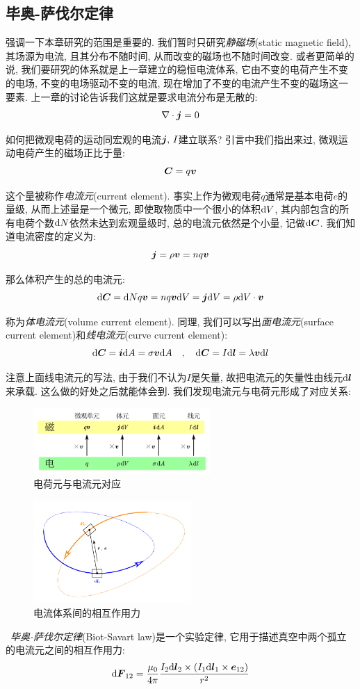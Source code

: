 \subsection{毕奥-萨伐尔定律}

强调一下本章研究的范围是重要的. 我们暂时只研究\emph{静磁场}(static magnetic field), 其场源为电流, 且其分布不随时间, 从而改变的磁场也不随时间改变. 或者更简单的说, 我们要研究的体系就是上一章建立的稳恒电流体系, 它由不变的电荷产生不变的电场, 不变的电场驱动不变的电流, 现在增加了不变的电流产生不变的磁场这一要素. 上一章的讨论告诉我们这就是要求电流分布是无散的:
\[\nabla \cdot \boldsymbol{j}=0\]

如何把微观电荷的运动同宏观的电流$\boldsymbol{j},\,I$建立联系? 引言中我们指出来过, 微观运动电荷产生的磁场正比于量:
\[\boldsymbol{C}=q\boldsymbol{v}\]

这个量被称作\emph{电流元}(current element). 事实上作为微观电荷$q$通常是基本电荷$e$的量级, 从而上述量是一个微元, 即使取物质中一个很小的体积$\textrm{d} V$, 其内部包含的所有电荷个数$\textrm{d} N$依然未达到宏观量级时, 总的电流元依然是个小量, 记做$\textrm{d}\boldsymbol{C}$. 我们知道电流密度的定义为:
\[\boldsymbol{j}=\rho\boldsymbol{v}=nq\boldsymbol{v}\]

那么体积产生的总的电流元:
\[\textrm{d} \boldsymbol{C}=\textrm{d} N q\boldsymbol{v}=nq\boldsymbol{v}\textrm{d} V=\boldsymbol{j}\textrm{d} V=\rho\textrm{d} V\cdot\boldsymbol{v}\]

称为\emph{体电流元}(volume current element). 同理, 我们可以写出\emph{面电流元}(surface current element)和\emph{线电流元}(curve current element):
\[\textrm{d} \boldsymbol{C}=\boldsymbol{i}\textrm{d} A=\sigma\boldsymbol{v}\textrm{d} A\quad ,\quad \textrm{d} \boldsymbol{C}=I\textrm{d} \boldsymbol{l}=\lambda \boldsymbol{v}\textrm{d} l\]

注意上面线电流元的写法, 由于我们不认为$I$是矢量, 故把电流元的矢量性由线元$\textrm{d} \boldsymbol{l}$来承载. 这么做的好处之后就能体会到. 我们发现电流元与电荷元形成了对应关系:
\begin{figure}[H]
\centering
\includegraphics[width=0.6\textwidth]{image/7-4-4.png}
\caption{电荷元与电流元对应}
\end{figure}

\begin{figure}
\centering
\vspace{-1cm}
\includegraphics[width=6cm]{image/7-4-5.png}
\caption{电流体系间的相互作用力}
\end{figure}
$\phantom{0}\!\!\!$\emph{毕奥-萨伐尔定律}(Biot-Savart law)是一个实验定律, 它用于描述真空中两个孤立的电流元之间的相互作用力:
\[\textrm{d} \boldsymbol{F}_{12}=\frac{\mu_0}{4\pi}\frac{I_2\textrm{d} \boldsymbol{l}_2\times (I_1\textrm{d} \boldsymbol{l}_1\times \boldsymbol{e}_{12})}{r^2}\]

